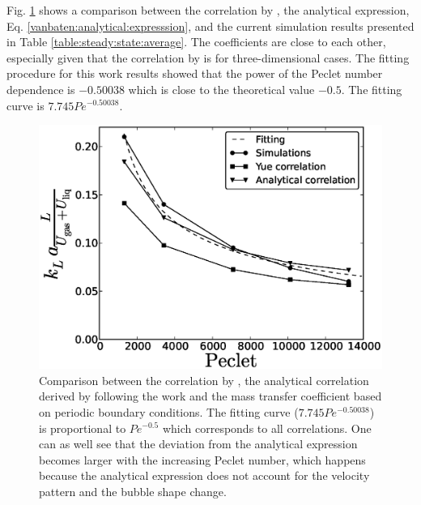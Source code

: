 \documentclass[review,12pt]{elsarticle}
\begin{document}
Fig. \ref{fig:volume:mass:coefficient} shows a comparison between the correlation by
\citet{yue-mass}, the analytical expression, Eq. \ref{vanbaten:analytical:expresssion}, and the current
simulation results presented in Table
\ref{table:steady:state:average}. The coefficients are close to each other, especially given that
the correlation by \citet{yue-mass} is for three-dimensional cases. The fitting procedure for this work results showed
that the power of
the Peclet number dependence  is $-0.50038$ which is close to the theoretical value $-0.5$.  The fitting curve is $7.745 Pe^{-0.50038}$.
\begin{figure}[htb!]
\includegraphics[width=\textwidth]{correlations_comparison.eps}
\caption{Comparison between the correlation by \citet{yue-mass}, the analytical correlation derived by following the work
\cite{irandoust} and the mass transfer coefficient based
on periodic boundary conditions. The fitting curve ($7.745 Pe^{-0.50038}$) is proportional to $Pe^{-0.5}$ which corresponds
to all correlations. One can as well see that the deviation from the analytical expression becomes
larger with the increasing Peclet number, which happens because the analytical expression does
 not account for the velocity pattern and the bubble shape change.\label{fig:volume:mass:coefficient}}
\end{figure}
\end{document}
